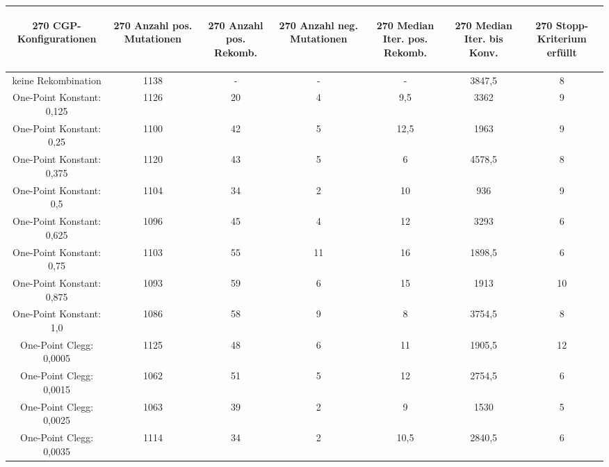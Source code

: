 \begin{table}[H]
	\centering
	\begin{tabular}{c | c | c | c | c | c | c}
		\begin{turn}{270} \textbf{CGP-Konfigurationen} \end{turn} & \begin{turn}{270} \textbf{Anzahl pos. Mutationen} \end{turn} & \begin{turn}{270} \textbf{Anzahl pos. Rekomb.} \end{turn} & \begin{turn}{270} \textbf{Anzahl neg. Mutationen} \end{turn} & \begin{turn}{270} \textbf{Median Iter. pos. Rekomb.} \end{turn} & \begin{turn}{270} \textbf{Median Iter. bis Konv.} \end{turn} & \begin{turn}{270} \textbf{Stopp-Kriterium erfüllt} \end{turn}\\
		\hline
		keine Rekombination & 1138 & - & - & - & 3847,5 & 8\\
		\hline
		One-Point Konstant: 0,125 & 1126 & 20 & 4 & 9,5 & 3362 & 9\\
		\hline
		One-Point Konstant: 0,25 & 1100 & 42 & 5 & 12,5 & 1963 & 9\\
		\hline
		One-Point Konstant: 0,375 & 1120 & 43 & 5 & 6 & 4578,5 & 8\\
		\hline
		One-Point Konstant: 0,5 & 1104 & 34 & 2 & 10 & 936 & 9\\
		\hline
		One-Point Konstant: 0,625 & 1096 & 45 & 4 & 12 & 3293 & 6\\
		\hline
		One-Point Konstant: 0,75 & 1103 & 55 & 11 & 16 & 1898,5 & 6\\
		\hline
		One-Point Konstant: 0,875 & 1093 & 59 & 6 & 15 & 1913 & 10\\
		\hline
		One-Point Konstant: 1,0 & 1086 & 58 & 9 & 8 & 3754,5 & 8\\
		\hline
		One-Point Clegg: 0,0005 & 1125 & 48 & 6 & 11 & 1905,5 & 12\\
		\hline
		One-Point Clegg: 0,0015 & 1062 & 51 & 5 & 12 & 2754,5 & 6\\
		\hline
		One-Point Clegg: 0,0025 & 1063 & 39 & 2 & 9 & 1530 & 5\\
		\hline
		One-Point Clegg: 0,0035 & 1114 & 34 & 2 & 10,5 & 2840,5 & 6\\

\end{tabular}
\end{table}
